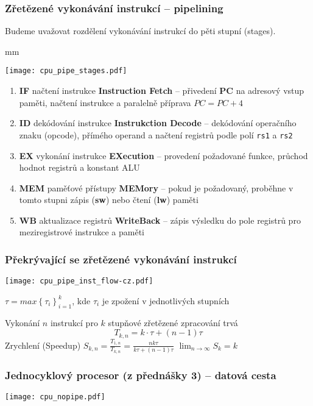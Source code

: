 \documentclass{beamer}
\begin{document}
\begin{frame}
\frametitle{Zřetězené vykonávání instrukcí -- pipelining}

Budeme uvažovat rozdělení vykonávání instrukcí do pěti stupní (stages).

 mm

{
\centering
\texttt{[image: cpu\_pipe\_stages.pdf]}
}

\begin{enumerate}
 \item \textbf{IF} načtení instrukce \textbf{Instruction Fetch} -- přivedení \textbf{PC} na adresový vstup paměti, načtení instrukce a paralelně příprava $PC = PC + 4$
 \item \textbf{ID} dekódování instrukce \textbf{Instrukction Decode} -- dekódování operačního znaku (opcode), přímého operand a načtení registrů podle polí \texttt{rs1} a \texttt{rs2}
 \item \textbf{EX} vykonání instrukce \textbf{EXecution} -- provedení požadované funkce, průchod hodnot registrů a konstant ALU
 \item \textbf{MEM} paměťové přístupy \textbf{MEMory} -- pokud je požadovaný, proběhne v tomto stupni zápis (\textbf{sw}) nebo čtení (\textbf{lw}) paměti
 \item \textbf{WB} aktualizace registrů \textbf{WriteBack} -- zápis výsledku do pole registrů pro meziregistrové instrukce a paměti
\end{enumerate}

\end{frame}

\begin{frame}
\frametitle{Překrývající se zřetězené vykonávání instrukcí}
\texttt{[image: cpu\_pipe\_inst\_flow-cz.pdf]}

$\tau = max{\left\lbrace \tau_i \right\rbrace}^k_{i=1}$,  kde $\tau_i$ je zpožení v jednotlivých stupních

Vykonání $n$ instrukcí pro $k$ stupňové zřetězené zpracování trvá
$$T_{k,n} = k \cdot \tau + (n - 1) \tau$$
Zrychlení (Speedup)
\hskip 7mm
$S_{k,n} = \frac{T_{1,n}}{T_{k,n}} = \frac{n k \tau}{k \tau + (n - 1) \tau}$
\hskip 7mm
$\lim_{n \rightarrow \infty} S_k = k$

\end{frame}

\begin{frame}
\frametitle{Jednocyklový procesor (z přednášky 3) -- datová cesta}
\texttt{[image: cpu\_nopipe.pdf]}
\end{frame}
\end{document}
